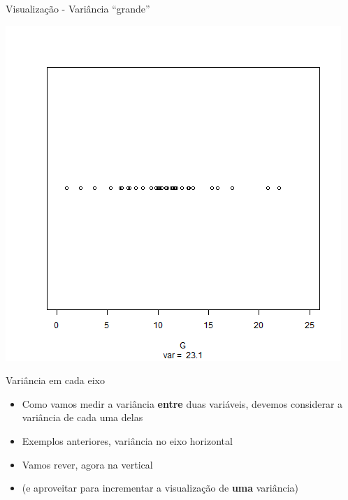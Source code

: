 \documentclass{beamer}
\begin{document}
\begin{frame}{Visualização - Variância ``grande''}
  \begin{center}
    \includegraphics[height=.8\textheight]{Cap17/dot-G}
  \end{center}
\end{frame}

\begin{frame}{Variância em cada eixo}
  \begin{itemize}
  \item Como vamos medir a variância {\bf entre} duas variáveis, devemos considerar a variância de cada uma delas
  \item Exemplos anteriores, variância no eixo horizontal
  \item Vamos rever, agora na vertical
  \item (e aproveitar para incrementar a visualização de {\bf uma} variância)
  \end{itemize}
\end{frame}
\end{document}
